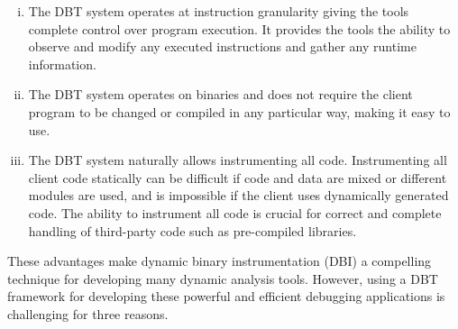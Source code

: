 
\begin{enumerate}[i)]
\item The DBT system operates at instruction granularity giving the tools complete control over program execution. It provides the tools the ability to observe and modify any executed instructions and gather any runtime information. 
\item The DBT system operates on binaries and does not require the client program to be changed or compiled in any particular way, making it easy to use. %
\item The DBT system naturally allows instrumenting all code. Instrumenting all client code statically can be difficult if code and data are mixed or different modules are used, and is impossible if the client uses dynamically generated code. The ability to instrument all code is crucial for correct and complete handling of third-party code such as pre-compiled libraries.  
\end{enumerate}
These advantages make dynamic binary instrumentation (DBI) a compelling technique for developing many dynamic analysis tools. However, using a DBT framework for developing these powerful and efficient debugging applications is challenging for three reasons.







